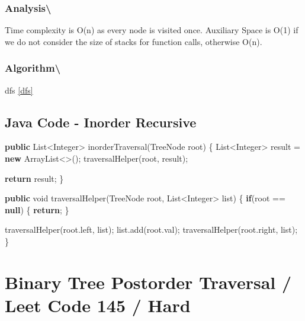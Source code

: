 \documentclass[]{book}
\newenvironment{Shaded}{\begin{snugshade}}{\end{snugshade}}
\newcommand{\BuiltInTok}[1]{#1}
\newcommand{\DataTypeTok}[1]{\textcolor[rgb]{0.13,0.29,0.53}{#1}}
\newcommand{\FunctionTok}[1]{\textcolor[rgb]{0.00,0.00,0.00}{#1}}
\newcommand{\KeywordTok}[1]{\textcolor[rgb]{0.13,0.29,0.53}{\textbf{#1}}}
\newcommand{\NormalTok}[1]{#1}
\begin{document}
\hypertarget{analysis-77}{%
\subsubsection{Analysis\textbackslash{}}\label{analysis-77}}

Time complexity is O(n) as every node is visited once. Auxiliary Space is O(1) if we do not consider the size of stacks
for function calls, otherwise O(n).

\hypertarget{algorithm-78}{%
\subsubsection{Algorithm\textbackslash{}}\label{algorithm-78}}

dfs \ref{dfs}

\hypertarget{java-code---inorder-recursive}{%
\subsection{Java Code - Inorder Recursive}\label{java-code---inorder-recursive}}

\begin{Shaded}
\begin{Highlighting}[]
\KeywordTok{public} \BuiltInTok{List}\NormalTok{<}\BuiltInTok{Integer}\NormalTok{> }\FunctionTok{inorderTraversal}\NormalTok{(}\BuiltInTok{TreeNode}\NormalTok{ root) \{}
    \BuiltInTok{List}\NormalTok{<}\BuiltInTok{Integer}\NormalTok{> result = }\KeywordTok{new} \BuiltInTok{ArrayList}\NormalTok{<>();}
    \FunctionTok{traversalHelper}\NormalTok{(root, result);}

    \KeywordTok{return}\NormalTok{ result;}
\NormalTok{\}}

\KeywordTok{public} \DataTypeTok{void} \FunctionTok{traversalHelper}\NormalTok{(}\BuiltInTok{TreeNode}\NormalTok{ root, }\BuiltInTok{List}\NormalTok{<}\BuiltInTok{Integer}\NormalTok{> list) \{}
    \KeywordTok{if}\NormalTok{(root == }\KeywordTok{null}\NormalTok{) \{}
        \KeywordTok{return}\NormalTok{;}
\NormalTok{    \}}

    \FunctionTok{traversalHelper}\NormalTok{(root.}\FunctionTok{left}\NormalTok{, list);}
\NormalTok{    list.}\FunctionTok{add}\NormalTok{(root.}\FunctionTok{val}\NormalTok{);}
    \FunctionTok{traversalHelper}\NormalTok{(root.}\FunctionTok{right}\NormalTok{, list);}
\NormalTok{\}}
\end{Highlighting}
\end{Shaded}

\hypertarget{binary-tree-postorder-traversal-leet-code-145-hard}{%
\section{Binary Tree Postorder Traversal / Leet Code 145 / Hard}\label{binary-tree-postorder-traversal-leet-code-145-hard}}
\end{document}
